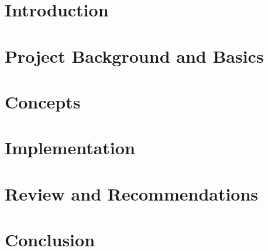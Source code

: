 \documentclass[11pt]{report}
\begin{document}
  
  
  
  
  
  \tableofcontents
  
  \chapter{Introduction}
  \label{cha:intro}
  
    
  
  \chapter{Project Background and Basics}
  \label{cha:background}
  
    
  
  \chapter{Concepts}
  \label{cha:concepts}
  
    
  
  \chapter{Implementation}
  \label{cha:impl}
  
    
  
  \chapter{Review and Recommendations}
  \label{cha:review}
    
    
    
  \chapter{Conclusion}
  \label{cha:conc}
  
    
  
\end{document}
